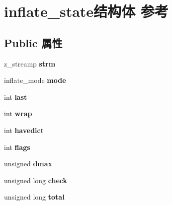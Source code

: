 \hypertarget{structinflate__state}{}\section{inflate\+\_\+state结构体 参考}
\label{structinflate__state}
\subsection*{Public 属性}
\begin{DoxyCompactItemize}
\item 
\mbox{\label{structinflate__state_a67cc6a2f6ed1434b58e9308fbb9e7c2c}} 
z\+\_\+streamp {\bfseries strm}
\item 
\mbox{\label{structinflate__state_a9c7906fee7eeeb450b13576531ca639d}} 
inflate\+\_\+mode {\bfseries mode}
\item 
\mbox{\label{structinflate__state_ab3cbcd2c5ff3b0b8b34ef402a13afdf7}} 
int {\bfseries last}
\item 
\mbox{\label{structinflate__state_a990d157b5c0d4ba178c3361de9ce6561}} 
int {\bfseries wrap}
\item 
\mbox{\label{structinflate__state_a2eb1cd634ed6baade952ffa5938ebcdc}} 
int {\bfseries havedict}
\item 
\mbox{\label{structinflate__state_a9dcf6151443750d75b2283d0a3e62c39}} 
int {\bfseries flags}
\item 
\mbox{\label{structinflate__state_ae3d433011714e673b22e82156acc4416}} 
unsigned {\bfseries dmax}
\item 
\mbox{\label{structinflate__state_ae597e4f5c37b9f7881015384bf826371}} 
unsigned long {\bfseries check}
\item 
\mbox{\label{structinflate__state_af9d1071eb75b1ee37a151ccec8dfee95}} 
unsigned long {\bfseries total}
\item 
\mbox{\label{structinflate__state_aac35b33a559009eb4bc0e2bdd8e9b5c6}} 

\end{DoxyCompactItemize}
